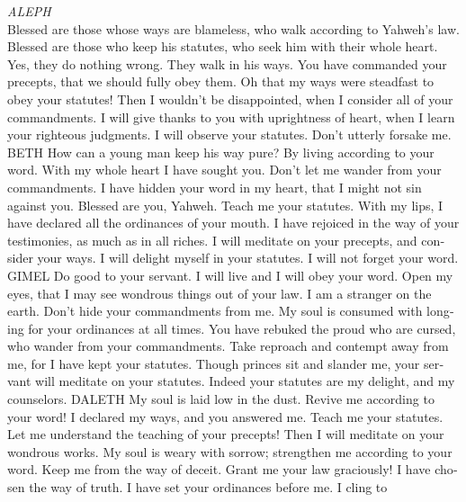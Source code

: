 \begin{paracol}{2}
\begin{otherlanguage}{english}
\emph{ALEPH}\\
 Blessed are those whose ways are blameless, who walk
according to Yahweh's law.  Blessed are those who keep his
statutes, who seek him with their whole heart.  Yes, they
do nothing wrong. They walk in his ways.  You have
commanded your precepts, that we should fully obey them. 
Oh that my ways were steadfast to obey your statutes! 
Then I wouldn't be disappointed, when I consider all of your
commandments.  I will give thanks to you with uprightness
of heart, when I learn your righteous judgments.  I will
observe your statutes. Don't utterly forsake me. BETH  How
can a young man keep his way pure? By living according to your word.
 With my whole heart I have sought you. Don't let me
wander from your commandments.  I have hidden your word
in my heart, that I might not sin against you.  Blessed
are you, Yahweh. Teach me your statutes.  With my lips, I
have declared all the ordinances of your mouth.  I have
rejoiced in the way of your testimonies, as much as in all riches.
 I will meditate on your precepts, and consider your
ways.  I will delight myself in your statutes. I will not
forget your word. GIMEL  Do good to your servant. I will
live and I will obey your word.  Open my eyes, that I may
see wondrous things out of your law.  I am a stranger on
the earth. Don't hide your commandments from me.  My soul
is consumed with longing for your ordinances at all times.
 You have rebuked the proud who are cursed, who wander
from your commandments.  Take reproach and contempt away
from me, for I have kept your statutes.  Though princes
sit and slander me, your servant will meditate on your statutes.
 Indeed your statutes are my delight, and my counselors.
DALETH  My soul is laid low in the dust. Revive me
according to your word!  I declared my ways, and you
answered me. Teach me your statutes.  Let me understand
the teaching of your precepts! Then I will meditate on your wondrous
works.  My soul is weary with sorrow; strengthen me
according to your word.  Keep me from the way of deceit.
Grant me your law graciously!  I have chosen the way of
truth. I have set your ordinances before me.  I cling to

\end{otherlanguage}
\end{paracol}

